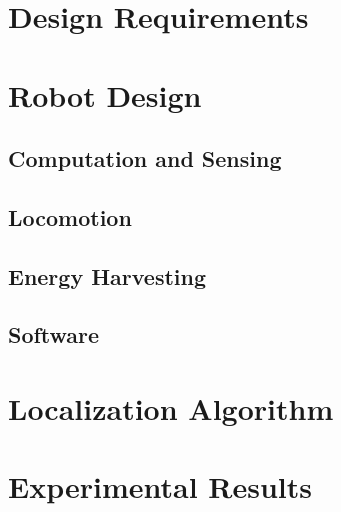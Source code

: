 \documentclass[letterpaper, 10 pt, conference]{ieeeconf}  %
\begin{document}
\section{Design Requirements}




\section{Robot Design}



\subsection{Computation and Sensing}

\subsection{Locomotion}


\subsection{Energy Harvesting}

\subsection{Software}


\section{Localization Algorithm}

\section{Experimental Results}
\end{document}
